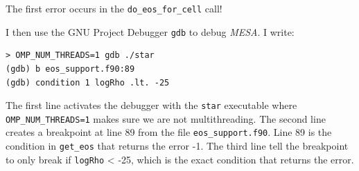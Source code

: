 \documentclass[a4paper,10pt]{article}
\begin{document}
The first error occurs in the \lstinline[style=output, breaklines=true]|do_eos_for_cell| call!

I then use the GNU Project Debugger \lstinline[style=output, breaklines=true]|gdb| to debug \emph{MESA}. I write:
\begin{verbatim}
> OMP_NUM_THREADS=1 gdb ./star
(gdb) b eos_support.f90:89
(gdb) condition 1 logRho .lt. -25
\end{verbatim}
The first line activates the debugger with the \lstinline[style=output, breaklines=true]|star| executable where \lstinline[style=output, breaklines=true]|OMP_NUM_THREADS=1| makes sure we are not multithreading.
The second line creates a breakpoint at line 89 from the file \lstinline[style=output, breaklines=true]|eos_support.f90|. Line 89 is the condition in \lstinline[style=output, breaklines=true]|get_eos| that returns the error -1.
The third line tell the breakpoint to only break if \lstinline[style=output, breaklines=true]|logRho| < -25, which is the exact condition that returns the error.
\end{document}
